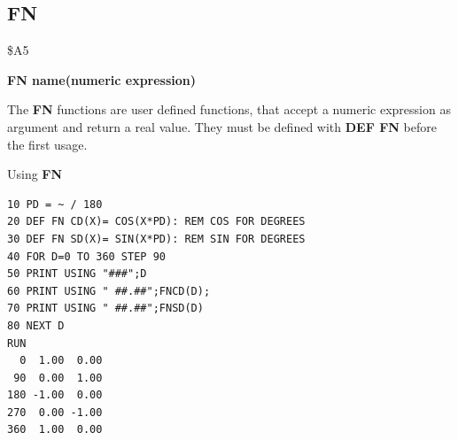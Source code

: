 
\newpage
\subsection{FN}
\begin{description}[leftmargin=2cm,style=nextline]
\item [Token:] \$A5
\item [Format:] {\bf FN name(numeric expression)}
\item [Usage:] The {\bf FN} functions are user defined
               functions, that accept a numeric expression as
               argument and return a real value.
               They must be defined with {\bf DEF FN} before
               the first usage.

\item [Example:] Using {\bf FN}
\begin{tcolorbox}[colback=black,coltext=white]
\verbatimfont{\codefont}
\begin{verbatim}
10 PD = ~ / 180
20 DEF FN CD(X)= COS(X*PD): REM COS FOR DEGREES
30 DEF FN SD(X)= SIN(X*PD): REM SIN FOR DEGREES
40 FOR D=0 TO 360 STEP 90
50 PRINT USING "###";D
60 PRINT USING " ##.##";FNCD(D);
70 PRINT USING " ##.##";FNSD(D)
80 NEXT D
RUN
  0  1.00  0.00
 90  0.00  1.00
180 -1.00  0.00
270  0.00 -1.00
360  1.00  0.00
\end{verbatim}
\end{tcolorbox}
\end{description}


\newpage
